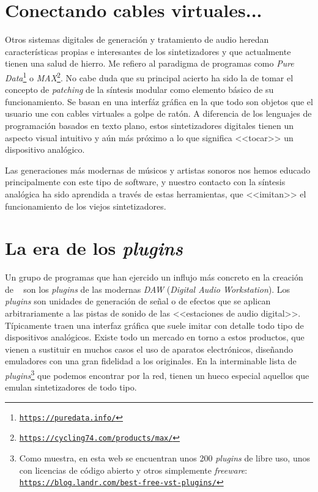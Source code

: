 \section{Conectando cables virtuales...}

Otros sistemas digitales de generación y tratamiento de audio heredan características propias e interesantes de los sintetizadores y que actualmente tienen una salud de hierro. Me refiero al paradigma de programas como \emph{Pure Data}\footnote{\href{https://puredata.info/}{\texttt{https://puredata.info/}}} o \emph{MAX}\footnote{\href{https://cycling74.com/products/max/}{\texttt{https://cycling74.com/products/max/}}}. No cabe duda que su principal acierto ha sido la de tomar el concepto de \emph{patching} de la síntesis modular como elemento básico de su funcionamiento. Se basan en una interfáz gráfica en la que todo son objetos que el usuario une con cables virtuales a golpe de ratón. A diferencia de los lenguajes de programación basados en texto plano, estos sintetizadores digitales tienen un aspecto visual intuitivo y aún más próximo a lo que significa <<tocar>> un dispositivo analógico. 

Las generaciones más modernas de músicos y artistas sonoros nos hemos educado principalmente con este tipo de software, y nuestro contacto con la síntesis analógica ha sido aprendida a través de estas herramientas, que <<imitan>> el funcionamiento de los viejos sintetizadores.

\section{La era de los \textit{plugins}}

Un grupo de programas que han ejercido un influjo más concreto en la creación de \appName~ son los \textit{plugins} de las modernas \textit{DAW} (\textit{Digital Audio Workstation}). Los \textit{plugins} son unidades de generación de señal o de efectos que se aplican arbitrariamente a las pistas de sonido de las <<estaciones de audio digital>>. Típicamente traen una interfaz gráfica que suele imitar con detalle todo tipo de dispositivos analógicos. Existe todo un mercado en torno a estos productos, que vienen a sustituir en muchos casos el uso de aparatos electrónicos, diseñando emuladores con una gran fidelidad a los originales. En la interminable lista de \textit{plugins}\footnote{Como muestra, en esta web se encuentran unos 200 \textit{plugins} de libre uso, unos con licencias de código abierto y otros simplemente \textit{freeware}: \href{https://blog.landr.com/best-free-vst-plugins/}{\texttt{https://blog.landr.com/best-free-vst-plugins/}}} que podemos encontrar por la red, tienen un hueco especial aquellos que emulan sintetizadores de todo tipo. 

